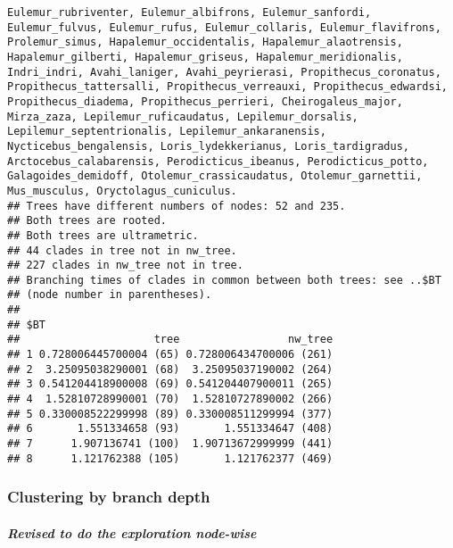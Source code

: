 \documentclass[
]{article}
\begin{document}
\begin{verbatim}
Eulemur_rubriventer, Eulemur_albifrons, Eulemur_sanfordi, Eulemur_fulvus, Eulemur_rufus, Eulemur_collaris, Eulemur_flavifrons, Prolemur_simus, Hapalemur_occidentalis, Hapalemur_alaotrensis, Hapalemur_gilberti, Hapalemur_griseus, Hapalemur_meridionalis, Indri_indri, Avahi_laniger, Avahi_peyrierasi, Propithecus_coronatus, Propithecus_tattersalli, Propithecus_verreauxi, Propithecus_edwardsi, Propithecus_diadema, Propithecus_perrieri, Cheirogaleus_major, Mirza_zaza, Lepilemur_ruficaudatus, Lepilemur_dorsalis, Lepilemur_septentrionalis, Lepilemur_ankaranensis, Nycticebus_bengalensis, Loris_lydekkerianus, Loris_tardigradus, Arctocebus_calabarensis, Perodicticus_ibeanus, Perodicticus_potto, Galagoides_demidoff, Otolemur_crassicaudatus, Otolemur_garnettii, Mus_musculus, Oryctolagus_cuniculus.
## Trees have different numbers of nodes: 52 and 235.
## Both trees are rooted.
## Both trees are ultrametric.
## 44 clades in tree not in nw_tree.
## 227 clades in nw_tree not in tree.
## Branching times of clades in common between both trees: see ..$BT
## (node number in parentheses).
## 
## $BT
##                     tree                 nw_tree
## 1 0.728006445700004 (65) 0.728006434700006 (261)
## 2  3.25095038290001 (68)  3.25095037190002 (264)
## 3 0.541204418900008 (69) 0.541204407900011 (265)
## 4  1.52810728990001 (70)  1.52810727890002 (266)
## 5 0.330008522299998 (89) 0.330008511299994 (377)
## 6       1.551334658 (93)       1.551334647 (408)
## 7      1.907136741 (100)  1.90713672999999 (441)
## 8      1.121762388 (105)       1.121762377 (469)
\end{verbatim}

\hypertarget{clustering-by-branch-depth}{%
\subsubsection{Clustering by branch
depth}\label{clustering-by-branch-depth}}

\hypertarget{revised-to-do-the-exploration-node-wise}{%
\subparagraph{Revised to do the exploration
node-wise}\label{revised-to-do-the-exploration-node-wise}}
\end{document}
